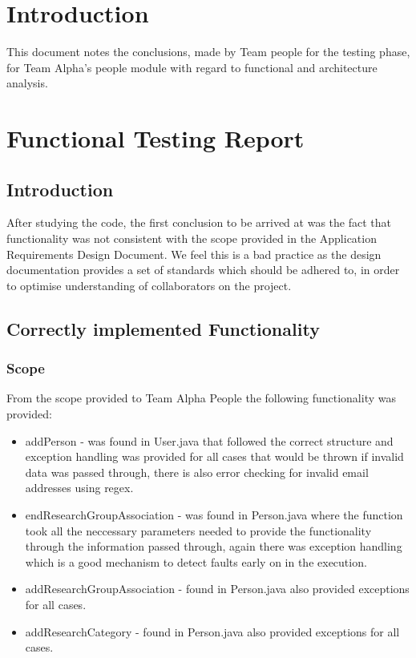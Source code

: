 \documentclass{article}
\begin{document}
\tableofcontents
\thispagestyle{empty}
\cleardoublepage

\setcounter{page}{1}
\section{Introduction}
This document notes the conclusions, made by Team people for the testing phase, for Team Alpha's people module with regard to functional and architecture analysis. \\

\newpage

\section{Functional Testing Report}
	\subsection{Introduction}
	After studying the code, the first conclusion to be arrived at was the fact that functionality was not consistent with the scope provided in the Application Requirements Design Document. We feel this is a bad practice as the design documentation provides a set of standards which should be adhered to, in order to optimise understanding of collaborators on the project.\\

	\subsection{Correctly implemented Functionality}
	\subsubsection{Scope}
	From the scope provided to Team Alpha People the following functionality was provided:
	\begin{itemize}
		\item addPerson - was found in User.java that followed the correct structure and exception handling was provided for all cases that would be thrown if invalid data was passed through, there is also error checking for invalid email addresses using regex.
		\item endResearchGroupAssociation - was found in Person.java where the function took all the neccessary parameters needed to provide the functionality through the information passed through, again there was exception handling which is a good mechanism to detect faults early on in the execution.
		\item addResearchGroupAssociation - found in Person.java also provided exceptions for all cases.
		\item addResearchCategory - found in Person.java also provided exceptions for all cases.
		
	\end{itemize}
	
\end{document}
